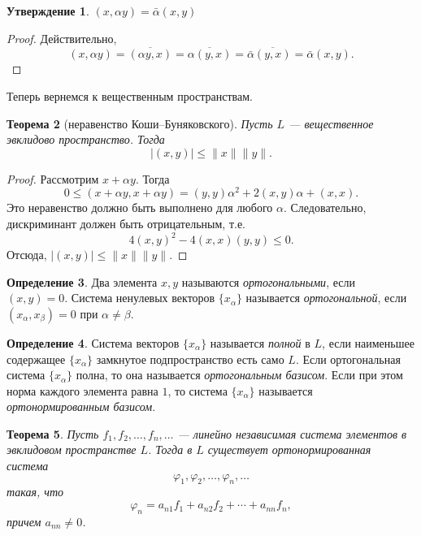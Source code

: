 \documentclass[12pt, titlepage, oneside]{amsbook}
\newtheorem{theorem}{Теорема}[chapter]
\newtheorem{claim}[theorem]{Утверждение}
\theoremstyle{definition}
\newtheorem{definition}[theorem]{Определение}
\theoremstyle{remark}
\begin{document}
\begin{claim}
	\label{Er1} $(x,\alpha y)=\bar{\alpha}(x,y)$
\end{claim}

\begin{proof}
	Действительно, $$(x,\alpha y)=\overline{(\alpha y,x)}=\overline{\alpha(y,x)}=\bar{\alpha}\overline{(y,x)}=\bar{\alpha}(x,y).$$
\end{proof}

Теперь вернемся к вещественным пространствам.

\begin{theorem}[неравенство Коши--Буняковского]
	\label{Ev1}
	Пусть $L$ --- вещественное эвклидово пространство. Тогда $$|(x,y)|\leq\|x\| \|y\|.$$
\end{theorem}


\begin{proof}
	Рассмотрим $x+\alpha y$. Тогда $$0\leq (x+\alpha y,x+\alpha y)=(y,y)\alpha^2+2(x,y)\alpha+(x,x).$$ Это неравенство должно быть выполнено для любого $\alpha$. Следовательно, дискриминант должен быть отрицательным, т.е. $$4(x,y)^2-4(x,x)(y,y)\leq 0.$$ Отсюда, $|(x,y)|\leq\|x\| \|y\|.$
\end{proof}

\begin{definition}
	Два элемента $x,y$ называются \emph{ортогональными}, если $(x,y)=0$. Система ненулевых векторов $\{x_{\alpha}\}$ называется \emph{ортогональной}, если $(x_{\alpha},x_{\beta})=0$ при $\alpha\neq\beta$.
\end{definition}

\begin{definition}
	Система векторов $\{x_{\alpha}\}$ называется \emph{полной} в $L$, если наименьшее содержащее $\{x_{\alpha}\}$ замкнутое подпространство есть само $L$. Если ортогональная система $\{x_{\alpha}\}$ полна, то она называется \emph{ортогональным базисом}. Если при этом норма каждого элемента равна $1$, то система $\{x_{\alpha}\}$ называется \emph{ортонормированным базисом}.
\end{definition}

\begin{theorem}
	\label{Ev2}
	Пусть $f_1,f_2,\ldots, f_n,\ldots$ --- линейно независимая система элементов в эвклидовом пространстве $L$. Тогда в $L$ существует ортонормированная система $$\varphi_1, \varphi_2,\ldots, \varphi_n,\ldots$$ такая, что $$\varphi_n=a_{n1}f_1+a_{n2}f_2+\cdots+a_{nn}f_n,$$ причем $a_{nn}\neq 0$.
\end{theorem}
\end{document}
